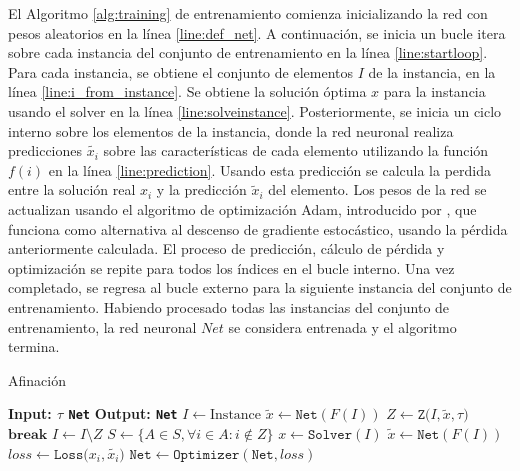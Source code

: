 \documentclass[spanish, a4paper, 12pt, openany,final]{book}
\begin{document}
El Algoritmo \ref{alg:training} de entrenamiento comienza inicializando la red con pesos aleatorios en la línea \ref{line:def_net}. A continuación, se inicia un bucle itera sobre cada instancia del conjunto de entrenamiento en la línea \ref{line:startloop}. Para cada instancia, se obtiene el conjunto de elementos $I$ de la instancia, en la línea \ref{line:i_from_instance}. Se obtiene la solución óptima $x$ para la instancia usando el solver en la línea \ref{line:solveinstance}. Posteriormente, se inicia un ciclo interno sobre los elementos de la instancia, donde la red neuronal realiza predicciones $\tilde{x_i}$ sobre las características de cada elemento utilizando la función \(f(i)\) en la línea \ref{line:prediction}.
Usando esta predicción se calcula la perdida entre la solución real $x_i$ y la predicción $\tilde{x}_i$ del elemento. Los pesos de la red se actualizan usando el algoritmo de optimización Adam, introducido por \cite{kingma2017adam}, que funciona como alternativa al descenso de gradiente estocástico, usando la pérdida anteriormente calculada. El proceso de predicción, cálculo de pérdida y optimización se repite para todos los índices en el bucle interno. Una vez completado, se regresa al bucle externo para la siguiente instancia del conjunto de entrenamiento. Habiendo procesado todas las instancias del conjunto de entrenamiento, la red neuronal $Net$ se considera entrenada y el algoritmo termina.

\begin{algorithm}[H]
	\caption{Afinación}\label{alg:tunning}
	\begin{algorithmic}[1]
		\Statex \textbf{Input: $\tau$ \texttt{Net}}
		\Statex \textbf{Output: \texttt{Net}}
				\State $I \gets \text{Instance}$ \label{line:def_I}
				\Loop
					\State $\tilde{x} \gets \texttt{Net}(F(I))$   \label{line:alg2:initial_pred}
					\State $Z \gets \texttt{Z($I,\tilde{x},\tau$)}$ \label{start_reduction_alg}
						\State $\textbf{break}$ 
					\EndIf
					\State $I \gets I\setminus Z$ \label{alg1:update_I_2}
					\State $S \gets \{A \in S, \forall i \in A: i \notin Z\}$  \label{end_reduction_alg}
				\State $x \gets \texttt{Solver}(I)$   \label{solve_smaller}
				\State $\tilde{x} \gets \texttt{Net}(F(I))$  \label{pred_smaller}
				\State $loss \gets \texttt{Loss($x_i,\tilde{x_i})$}$ \label{smaller_loss}
				\State $\texttt{Net} \gets \texttt{Optimizer}(\texttt{Net},loss)$	  \label{smaller_optim}
			\EndFor
			\EndLoop
		\EndFor
	\end{algorithmic}
\end{algorithm}
\end{document}
